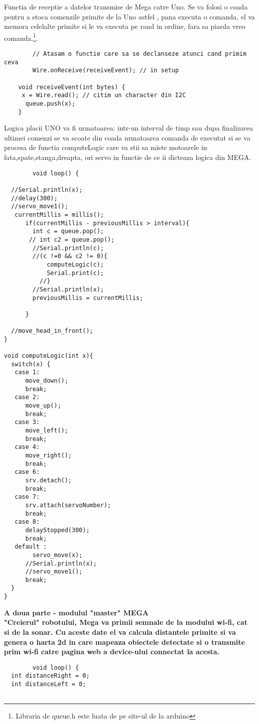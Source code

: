 \begin{itemize}
	\tab Functia de receptie a datelor transmise de Mega catre Uno. Se va folosi o coada pentru a stoca comenzile primite de la Uno astfel , pana executa o comanda, el va memora celelalte primite si le va executa pe rand in ordine, fara sa piarda vreo comanda.\footnote{Libraria de queue.h este luata de pe site-ul de la arduino}.
	\begin{verbatim}
		// Atasam o functie care sa se declanseze atunci cand primim ceva
 		Wire.onReceive(receiveEvent); // in setup

	void receiveEvent(int bytes) {
	 x = Wire.read(); // citim un character din I2C
 	  queue.push(x);
	}
	\end{verbatim}
	\tab Logica placii UNO va fi urmatoarea: intr-un interval de timp sau dupa finalizarea ultimei comenzi se va scoate din coada urmatoarea comanda de executat si se va procesa de functia computeLogic care va stii sa miste motoarele in fata,spate,stanga,dreapta, ori servo in functie de ce ii dicteaza logica din MEGA.\\

	\begin{verbatim}
		void loop() {
 
  //Serial.println(x);
  //delay(300);
  //servo_move1();
   currentMillis = millis();
      if(currentMillis - previousMillis > interval){
        int c = queue.pop();
       // int c2 = queue.pop();
        //Serial.println(c);
        //(c !=0 && c2 != 0){
            computeLogic(c);
            Serial.print(c);
          //}
        //Serial.println(x);
        previousMillis = currentMillis;
         
      }
 
  //move_head_in_front();
}

void computeLogic(int x){
  switch(x) {
   case 1:
      move_down();
      break;
   case 2:
      move_up();
      break;
   case 3:
      move_left();
      break;
   case 4:
      move_right();
      break;
   case 6:
      srv.detach();
      break;
   case 7:
      srv.attach(servoNumber);
      break;
   case 8:
      delayStopped(300);
      break;
   default :
        servo_move(x);
      //Serial.println(x);
      //servo_move1();
      break;
  }
}
	\end{verbatim}
	\tab\tab \bf{A doua parte - modulul "master" MEGA}\\

	\tab "Creierul" robotului, Mega va primii semnale de la modului wi-fi, cat si de la sonar. Cu aceste date el va calcula distantele primite si  va genera o harta 2d in care mapeaza obiectele detectate si o transmite prim wi-fi catre pagina web a device-ului connectat la acesta.\\
	\begin{verbatim}
		void loop() {  
  int distanceRight = 0;
  int distanceLeft = 0;


\end{verbatim}
\end{itemize}
